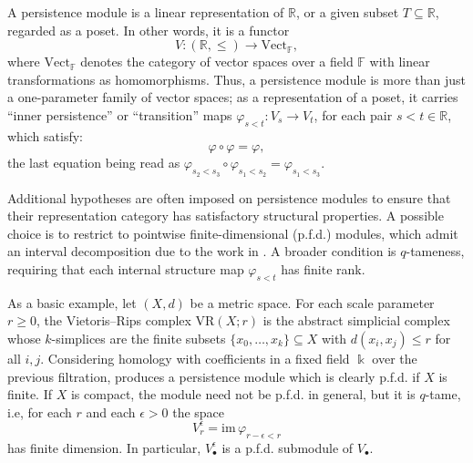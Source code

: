 \documentclass[11pt]{article}
\newcommand{\bu}{_{\bullet}}
\newcommand{\RR}{\mathbb{R}}
\begin{document}
A persistence module is a linear representation of $\RR$, or a given subset $T\subseteq \RR$, regarded as a poset. In other words, it is a functor
\begin{equation}\label{eqn defn pers module}
V: (\mathbb{R}, \leq) \to \mathrm{Vect}_\mathbb{F},
\end{equation}
where $\mathrm{Vect}_\mathbb{F}$ denotes the category of vector spaces over a field $\mathbb{F}$ with linear transformations as homomorphisms. 
Thus, a persistence module is more than just a one-parameter family of vector spaces; as a representation of a poset, it carries \enquote{inner persistence} or \enquote{transition} maps $\varphi_{s<t}: V_s \xrightarrow{~~} V_t$, for each pair $s<t \in \RR$, which satisfy:
\[ \varphi \circ \varphi = \varphi, \]
the last equation being read as $\varphi_{s_2<s_3} \circ \varphi_{s_1<s_2} = \varphi_{s_1<s_3}$.



Additional hypotheses are often imposed on persistence modules to ensure that their representation category has satisfactory structural properties. A possible choice is to restrict to pointwise finite-dimensional (p.f.d.) modules, which admit an interval decomposition due to the work in \cite{crawley2015decomposition}. A broader condition is $q$-tameness, requiring that each internal structure map $\varphi_{s<t}$ has finite rank.

As a basic example, let $(X,d)$ be a metric space. For each scale parameter $r\ge 0$, the Vietoris--Rips complex $\mathrm{VR}(X;r)$ is the abstract simplicial complex whose $k$-simplices are the finite subsets $\{x_0,\dots,x_k\}\subseteq X$ with $d(x_i,x_j)\le r$ for all $i,j$. Considering homology with coefficients in a fixed field $\Bbbk$ over the previous filtration, produces a persistence module which is clearly p.f.d. 
if $X$ is finite. If $X$ is compact, the module need not be p.f.d. in general, but it is $q$-tame, i.e, for each $r$ and each $\epsilon>0$ the space
\begin{equation}\label{eq epsilon approx of V}
V^{\epsilon}_r=\mathrm{im}\,\varphi_{r-\epsilon<r}    
\end{equation}
has finite dimension. 
In particular, $V^{\epsilon}\bu$ is a p.f.d. submodule of $V\bu$. 
\end{document}
